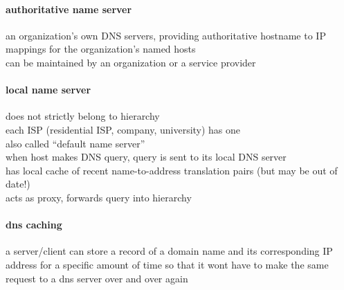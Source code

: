 \documentclass[a4paper,12pt]{article}
\begin{document}
\paragraph{authoritative name server}
\label{sec:orgdf2cbbe}
an organization’s own DNS servers, providing authoritative hostname to IP mappings for the organization’s named hosts\\
can be maintained by an organization or a service provider\\
\paragraph{local name server}
\label{sec:orgd652bbc}
does not strictly belong to hierarchy\\
each ISP (residential ISP, company, university) has one\\
also called “default name server”\\
when host makes DNS query, query is sent to its local DNS server\\
has local cache of recent name-to-address translation pairs (but may be out of date!)\\
acts as proxy, forwards query into hierarchy\\
\paragraph{dns caching}
\label{sec:org9916bc8}
a server/client can store a record of a domain name and its corresponding IP address for a specific amount of time so that it wont have to make the same request to a dns server over and over again\\
\end{document}
